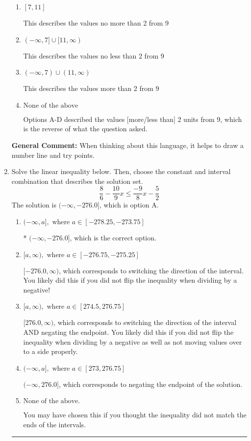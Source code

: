 \documentclass{extbook}[14pt]
\newcommand{\litem}[1]{\item #1

\rule{\textwidth}{0.4pt}}
\begin{document}
\begin{enumerate}
{\begin{enumerate}[label=\Alph*.]
This describes the values less than 2 from 9
\item \( [7, 11] \)

This describes the values no more than 2 from 9
\item \( (-\infty, 7] \cup [11, \infty) \)

This describes the values no less than 2 from 9
\item \( (-\infty, 7) \cup (11, \infty) \)

This describes the values more than 2 from 9
\item \( \text{None of the above} \)

Options A-D described the values [more/less than] 2 units from 9, which is the reverse of what the question asked.
\end{enumerate}

\textbf{General Comment:} When thinking about this language, it helps to draw a number line and try points.
}
\litem{
Solve the linear inequality below. Then, choose the constant and interval combination that describes the solution set.
\[ \frac{8}{6} - \frac{10}{9} x \leq \frac{-9}{8} x - \frac{5}{2} \]The solution is \( (-\infty, -276.0] \), which is option A.\begin{enumerate}[label=\Alph*.]
\item \( (-\infty, a], \text{ where } a \in [-278.25, -273.75] \)

* $(-\infty, -276.0]$, which is the correct option.
\item \( [a, \infty), \text{ where } a \in [-276.75, -275.25] \)

 $[-276.0, \infty)$, which corresponds to switching the direction of the interval. You likely did this if you did not flip the inequality when dividing by a negative!
\item \( [a, \infty), \text{ where } a \in [274.5, 276.75] \)

 $[276.0, \infty)$, which corresponds to switching the direction of the interval AND negating the endpoint. You likely did this if you did not flip the inequality when dividing by a negative as well as not moving values over to a side properly.
\item \( (-\infty, a], \text{ where } a \in [273, 276.75] \)

 $(-\infty, 276.0]$, which corresponds to negating the endpoint of the solution.
\item \( \text{None of the above}. \)

You may have chosen this if you thought the inequality did not match the ends of the intervals.
\end{enumerate}

}
\end{enumerate}
\end{document}
